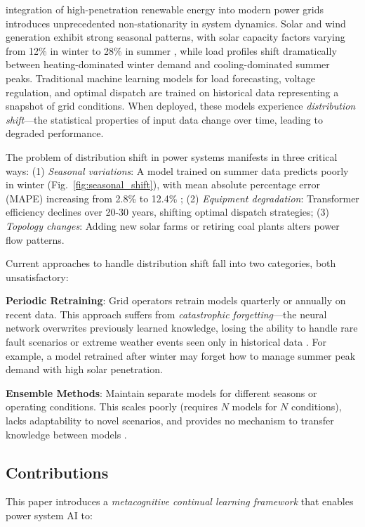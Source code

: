 \documentclass[journal]{IEEEtran}
\begin{document}
 integration of high-penetration renewable energy into modern power grids introduces unprecedented non-stationarity in system dynamics. Solar and wind generation exhibit strong seasonal patterns, with solar capacity factors varying from 12\% in winter to 28\% in summer \cite{nrel2023}, while load profiles shift dramatically between heating-dominated winter demand and cooling-dominated summer peaks. Traditional machine learning models for load forecasting, voltage regulation, and optimal dispatch are trained on historical data representing a snapshot of grid conditions. When deployed, these models experience \textit{distribution shift}—the statistical properties of input data change over time, leading to degraded performance.

The problem of distribution shift in power systems manifests in three critical ways: (1) \textit{Seasonal variations}: A model trained on summer data predicts poorly in winter (Fig.~\ref{fig:seasonal_shift}), with mean absolute percentage error (MAPE) increasing from 2.8\% to 12.4\% \cite{hong2020short}; (2) \textit{Equipment degradation}: Transformer efficiency declines over 20-30 years, shifting optimal dispatch strategies; (3) \textit{Topology changes}: Adding new solar farms or retiring coal plants alters power flow patterns. 

Current approaches to handle distribution shift fall into two categories, both unsatisfactory:

\textbf{Periodic Retraining}: Grid operators retrain models quarterly or annually on recent data. This approach suffers from \textit{catastrophic forgetting}—the neural network overwrites previously learned knowledge, losing the ability to handle rare fault scenarios or extreme weather events seen only in historical data \cite{kirkpatrick2017overcoming}. For example, a model retrained after winter may forget how to manage summer peak demand with high solar penetration.

\textbf{Ensemble Methods}: Maintain separate models for different seasons or operating conditions. This scales poorly (requires $N$ models for $N$ conditions), lacks adaptability to novel scenarios, and provides no mechanism to transfer knowledge between models \cite{dietterich2000ensemble}.

\subsection{Contributions}

This paper introduces a \textit{metacognitive continual learning framework} that enables power system AI to:
\end{document}
